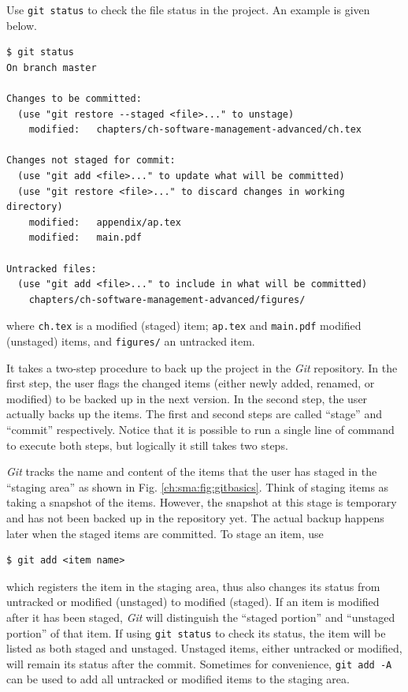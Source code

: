 Use \verb|git status| to check the file status in the project. An example is given below.
\begin{lstlisting}
$ git status
On branch master

Changes to be committed:
  (use "git restore --staged <file>..." to unstage)
	modified:   chapters/ch-software-management-advanced/ch.tex

Changes not staged for commit:
  (use "git add <file>..." to update what will be committed)
  (use "git restore <file>..." to discard changes in working directory)
	modified:   appendix/ap.tex
	modified:   main.pdf

Untracked files:
  (use "git add <file>..." to include in what will be committed)
	chapters/ch-software-management-advanced/figures/
\end{lstlisting}
where \verb|ch.tex| is a modified (staged) item; \verb|ap.tex| and \verb|main.pdf| modified (unstaged) items, and \verb|figures/| an untracked item.

It takes a two-step procedure to back up the project in the \textit{Git} repository. In the first step, the user flags the changed items (either newly added, renamed, or modified) to be backed up in the next version. In the second step, the user actually backs up the items. The first and second steps are called ``stage'' and ``commit'' respectively. Notice that it is possible to run a single line of command to execute both steps, but logically it still takes two steps.

\textit{Git} tracks the name and content of the items that the user has staged in the ``staging area'' as shown in Fig. \ref{ch:sma:fig:gitbasics}. Think of staging items as taking a snapshot of the items. However, the snapshot at this stage is temporary and has not been backed up in the repository yet. The actual backup happens later when the staged items are committed. To stage an item, use
\begin{lstlisting}
$ git add <item name>
\end{lstlisting}
which registers the item in the staging area, thus also changes its status from untracked or modified (unstaged) to modified (staged). If an item is modified after it has been staged, \textit{Git} will distinguish the ``staged portion'' and ``unstaged portion'' of that item. If using \verb|git status| to check its status, the item will be listed as both staged and unstaged. Unstaged items, either untracked or modified, will remain its status after the commit. Sometimes for convenience, \verb|git add -A| can be used to add all untracked or modified items to the staging area.

